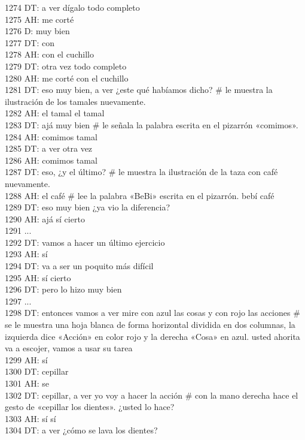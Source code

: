 1274 DT: a ver dígalo todo completo\\
1275 AH: me corté\\
1276 D: muy bien\\
1277 DT: con\\
1278 AH: con el cuchillo\\
1279 DT: otra vez todo completo\\
1280 AH: me corté con el cuchillo\\
1281 DT: eso muy bien, a ver ¿este qué habíamos dicho? # le muestra la ilustración  de los tamales nuevamente.\\
1282 AH: el tamal el tamal\\
1283 DT: ajá muy bien # le señala la palabra escrita en el pizarrón «comimos».\\
1284 AH: comimos tamal\\
1285 DT: a ver otra vez\\
1286 AH: comimos tamal\\
1287 DT: eso, ¿y el último? # le muestra la ilustración de la taza con café nuevamente.\\
1288 AH: el café # lee la palabra «BeBi» escrita en el pizarrón. bebí café\\
1289 DT: eso muy bien ¿ya vio la diferencia?\\
1290 AH: ajá sí cierto\\
1291 ...\\
1292 DT: vamos a hacer un último ejercicio\\
1293 AH: sí\\
1294 DT: va a ser un poquito más difícil\\
1295 AH: sí cierto\\
1296 DT: pero lo hizo muy bien\\
1297 ...\\
1298 DT: entonces vamos a ver mire con azul las cosas y con rojo las acciones # se le muestra una hoja blanca de forma horizontal dividida en dos columnas, la izquierda dice «Acción» en color rojo y la derecha «Cosa» en azul. usted ahorita va a escojer, vamos a usar su tarea\\
1299 AH: sí\\
1300 DT: cepillar\\
1301 AH: se\\
1302 DT: cepillar, a ver yo voy a hacer la acción # con la mano derecha hace el gesto de «cepillar los dientes». ¿usted lo hace?\\
1303 AH: sí sí\\
1304 DT: a ver ¿cómo se lava los dientes?\\
